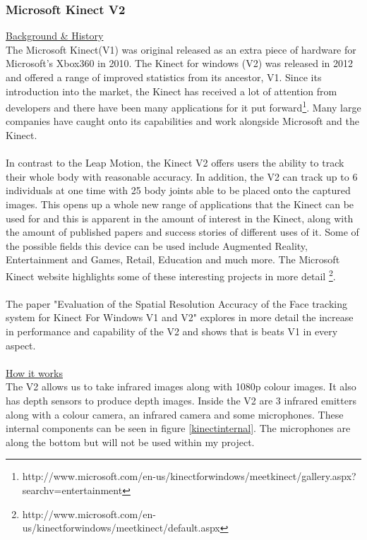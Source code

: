 \documentclass[11pt]{article}
\begin{document}
\subsubsection{Microsoft Kinect V2}
\underline{Background \& History}\\
The Microsoft Kinect(V1) was original released as an extra piece of hardware
for Microsoft's Xbox360 in 2010. The Kinect for windows (V2) was released
in 2012 and offered a range of improved statistics from its ancestor,
V1. Since its introduction into the market, the Kinect has received a lot of
attention from developers and there have been many applications for it put
forward\footnote{http://www.microsoft.com/en-us/kinectforwindows/meetkinect/gallery.aspx?searchv=entertainment}.
Many large companies have caught onto its capabilities and work 
alongside Microsoft and the Kinect.
\\ \\
In contrast to the Leap Motion, the Kinect V2 offers users the ability to track their 
whole body with reasonable accuracy. In addition, the V2 can track up to 6 individuals
at one time with 25 body joints able to be placed onto the captured images.
This opens up a whole new range of applications
that the Kinect can be used for and this is apparent in the amount of interest in the
Kinect, along with the amount of published papers and success stories of different
uses of it. Some of the possible fields this device can be used include 
Augmented Reality, Entertainment and Games, Retail, Education and much more. The 
Microsoft Kinect website highlights some of these interesting projects in more detail
\footnote{http://www.microsoft.com/en-us/kinectforwindows/meetkinect/default.aspx}.
\\ \\ 
The paper "Evaluation of the Spatial Resolution Accuracy of the Face 
tracking system for Kinect For Windows V1 and V2" \cite{AmonFuhrmann14}
explores in more detail the increase in performance and capability
of the V2 and shows that is beats V1 in every aspect. 
\\ \\
\underline{How it works} \\ 
The V2 allows us to take infrared images along with 1080p colour images. It 
also has depth sensors to produce depth images. Inside the V2 are 3 infrared
emitters along with a colour camera, an infrared camera and some microphones.
These internal components can be seen in figure \ref{kinectinternal}. The
microphones are along the bottom but will not be used within my project. 
\end{document}

